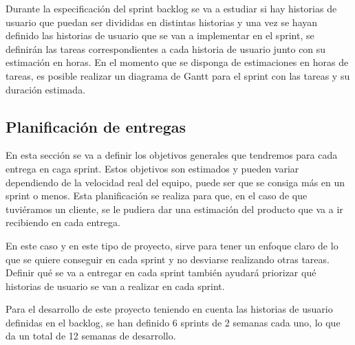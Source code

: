 Durante la especificación del sprint backlog se va a estudiar si hay historias de usuario que puedan ser divididas en distintas historias y una vez se hayan definido las historias de usuario que se van a implementar en el sprint, se definirán las tareas correspondientes a cada historia de usuario junto con su estimación en horas.
En el momento que se disponga de estimaciones en horas de tareas, es posible realizar un diagrama de Gantt para el sprint con las tareas y su duración estimada.

\subsection{Planificación de entregas}
En esta sección se va a definir los objetivos generales que tendremos para cada entrega en caga sprint. Estos objetivos son estimados y pueden variar dependiendo de la velocidad real del equipo, puede ser que se consiga más en un sprint o menos. Esta planificación se realiza para que, en el caso de que tuviéramos un cliente, se le pudiera dar una estimación del producto que va a ir recibiendo en cada entrega.

En este caso y en este tipo de proyecto, sirve para tener un enfoque claro de lo que se quiere conseguir en cada sprint y no desviarse realizando otras tareas.
Definir qué se va a entregar en cada sprint también ayudará priorizar qué historias de usuario se van a realizar en cada sprint.

Para el desarrollo de este proyecto teniendo en cuenta las historias de usuario definidas en el backlog, se han definido 6 sprints de 2 semanas cada uno, lo que da un total de 12 semanas de desarrollo.

